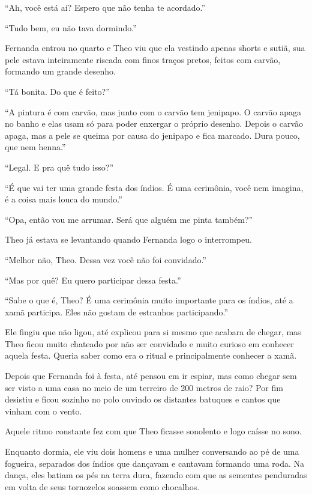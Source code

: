 ``Ah, você está aí? Espero que não tenha te acordado.''

``Tudo bem, eu não tava dormindo.''

Fernanda entrou no quarto e Theo viu que ela vestindo apenas shorts e
sutiã, sua pele estava inteiramente riscada com finos traços pretos,
feitos com carvão, formando um grande desenho.

``Tá bonita. Do que é feito?''

``A pintura é com carvão, mas junto com o carvão tem jenipapo. O carvão
apaga no banho e elas usam só para poder enxergar o próprio desenho.
Depois o carvão apaga, mas a pele se queima por causa do jenipapo e fica
marcado. Dura pouco, que nem henna.''

``Legal. E pra quê tudo isso?''

``É que vai ter uma grande festa dos índios. É uma cerimônia, você nem
imagina, é a coisa mais louca do mundo.''

``Opa, então vou me arrumar. Será que alguém me pinta também?''

Theo já estava se levantando quando Fernanda logo o interrompeu.

``Melhor não, Theo. Dessa vez você não foi convidado.''

``Mas por quê? Eu quero participar dessa festa.''

``Sabe o que é, Theo? É uma cerimônia muito importante para os índios,
até a xamã participa. Eles não gostam de estranhos participando.''

Ele fingiu que não ligou, até explicou para si mesmo que acabara de
chegar, mas Theo ficou muito chateado por não ser convidado e muito
curioso em conhecer aquela festa. Queria saber como era o ritual e
principalmente conhecer a xamã.

Depois que Fernanda foi à festa, até pensou em ir espiar, mas como
chegar sem ser visto a uma casa no meio de um terreiro de 200 metros de
raio? Por fim desistiu e ficou sozinho no polo ouvindo os distantes
batuques e cantos que vinham com o vento.

\asterisc


Aquele ritmo constante fez com que Theo ficasse sonolento e logo caísse
no sono.

Enquanto dormia, ele viu dois homens e uma mulher conversando ao pé de
uma fogueira, separados dos índios que dançavam e cantavam formando uma
roda. Na dança, eles batiam os pés na terra dura, fazendo com que as
sementes penduradas em volta de seus tornozelos soassem como chocalhos.

